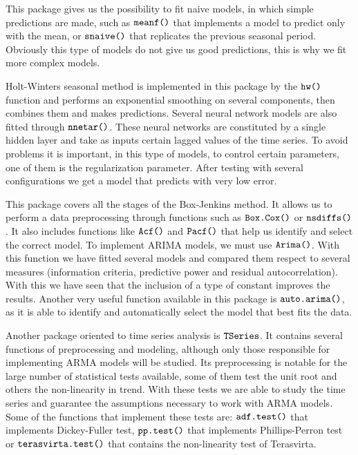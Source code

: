 \documentclass[12pt,a4paper,oneside]{article}
\begin{document}
This package gives us the possibility to fit naive models, in which simple predictions are made, such as $\verb!meanf()!$ that implements a model to predict only with the mean, or $\verb!snaive()!$ that replicates the previous seasonal period. Obviously this type of models do not give us good predictions, this is why we fit more complex models.

Holt-Winters seasonal method is implemented in this package by the $\verb!hw()!$ function and performs an exponential smoothing on several components, then combines them and makes predictions. Several neural network models are also fitted through $\verb!nnetar()!$. These neural networks are constituted by a single hidden layer and take as inputs certain lagged values of the time series. To avoid problems it is important, in this type of models, to control certain parameters, one of them is the regularization parameter. After testing with several configurations we get a model that predicts with very low error.

This package covers all the stages of the Box-Jenkins method. It allows us to perform a data preprocessing through functions such as $\verb!Box.Cox()!$ or $\verb!nsdiffs()!$. It also includes functions like $\verb!Acf()!$ and $\verb!Pacf()!$ that help us identify and select the correct model. To implement ARIMA models, we must use $\verb!Arima()!$. With this function we have fitted several models and compared them respect to several measures (information criteria, predictive power and residual autocorrelation). With this we have seen that the inclusion of a type of constant improves the results. Another very useful function available in this package is $\verb!auto.arima()!$, as it is able to identify and automatically select the model that best fits the data.

Another package oriented to time series analysis is $\verb!TSeries!$. It contains several functions of preprocessing and modeling, although only those responsible for implementing ARMA models will be studied. Its preprocessing is notable for the large number of statistical tests available, some of them test the unit root and others the non-linearity in trend. With these tests we are able to study the time series and guarantee the assumptions necessary to work with ARMA models. Some of the functions that implement these tests are: $\verb!adf.test()!$ that implements Dickey-Fuller test, $\verb!pp.test()!$ that implements Phillips-Perron test or $\verb!terasvirta.test()!$ that contains the non-linearity test of Terasvirta.
\end{document}
